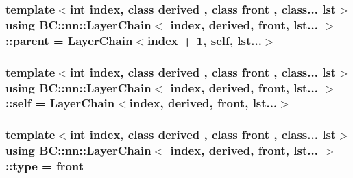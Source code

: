 \subsubsection[{\texorpdfstring{parent}{parent}}]{\setlength{\rightskip}{0pt plus 5cm}template$<$int index, class derived , class front , class... lst$>$ using {\bf B\+C\+::nn\+::\+Layer\+Chain}$<$ index, derived, front, lst... $>$\+::{\bf parent} =  {\bf Layer\+Chain}$<$index + 1, {\bf self}, lst...$>$}\hypertarget{structBC_1_1nn_1_1LayerChain_3_01index_00_01derived_00_01front_00_01lst_8_8_8_01_4_aa13da50858a3d1477c061e3a6678a880}{}\label{structBC_1_1nn_1_1LayerChain_3_01index_00_01derived_00_01front_00_01lst_8_8_8_01_4_aa13da50858a3d1477c061e3a6678a880}
\subsubsection[{\texorpdfstring{self}{self}}]{\setlength{\rightskip}{0pt plus 5cm}template$<$int index, class derived , class front , class... lst$>$ using {\bf B\+C\+::nn\+::\+Layer\+Chain}$<$ index, derived, front, lst... $>$\+::{\bf self} =  {\bf Layer\+Chain}$<$index, derived, front, lst...$>$}\hypertarget{structBC_1_1nn_1_1LayerChain_3_01index_00_01derived_00_01front_00_01lst_8_8_8_01_4_a019e4116d3fbd4915e563c3403038b3b}{}\label{structBC_1_1nn_1_1LayerChain_3_01index_00_01derived_00_01front_00_01lst_8_8_8_01_4_a019e4116d3fbd4915e563c3403038b3b}
\subsubsection[{\texorpdfstring{type}{type}}]{\setlength{\rightskip}{0pt plus 5cm}template$<$int index, class derived , class front , class... lst$>$ using {\bf B\+C\+::nn\+::\+Layer\+Chain}$<$ index, derived, front, lst... $>$\+::{\bf type} =  front}\hypertarget{structBC_1_1nn_1_1LayerChain_3_01index_00_01derived_00_01front_00_01lst_8_8_8_01_4_ab76878d061de75b9a45e97be78ab8e0e}{}\label{structBC_1_1nn_1_1LayerChain_3_01index_00_01derived_00_01front_00_01lst_8_8_8_01_4_ab76878d061de75b9a45e97be78ab8e0e}


